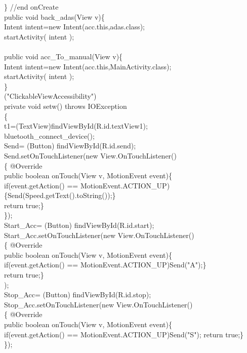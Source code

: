 \documentclass[12pt,a4paper]{report}
\begin{document}
{{{{{{{{{    \} //end onCreate\\
    public void back\_adas(View v)\{\\
        Intent intent=new Intent(acc.this,adas.class);\\
        startActivity( intent );\\
   \ }\\
    public void acc\_To\_manual(View v)\{\\
        Intent intent=new Intent(acc.this,MainActivity.class);\\
        startActivity( intent );\\
    \}\\
    \@SuppressLint("ClickableViewAccessibility")\\
     private void setw() throws IOException\\
    \{\\
        t1=(TextView)findViewById(R.id.textView1);\\
        bluetooth\_connect\_device();\\
        Send= (Button) findViewById(R.id.send);\\
        Send.setOnTouchListener(new View.OnTouchListener()\\
        \{   @Override\\
        public boolean onTouch(View v, MotionEvent event)\{\\
            if(event.getAction() == MotionEvent.ACTION\_UP)  
             \{Send(Speed.getText().toString());\}\\
              return true;\}\\
        \});\\
        Start\_Acc= (Button) findViewById(R.id.start);\\
        Start\_Acc.setOnTouchListener(new View.OnTouchListener()\\
       \{   @Override\\
        public boolean onTouch(View v, MotionEvent event)\{\\
            if(event.getAction() == MotionEvent.ACTION\_UP){Send("A");\}\\
            return true;\}\\
        });\\
        Stop\_Acc= (Button) findViewById(R.id.stop);\\
        Stop\_Acc.setOnTouchListener(new View.OnTouchListener()\\
        \{   @Override\\
        public boolean onTouch(View v, MotionEvent event)\{\\
            if(event.getAction() == MotionEvent.ACTION\_UP){Send("S");}
            return true;\}\\
        \});\\

}}}}}}}}
\end{document}
